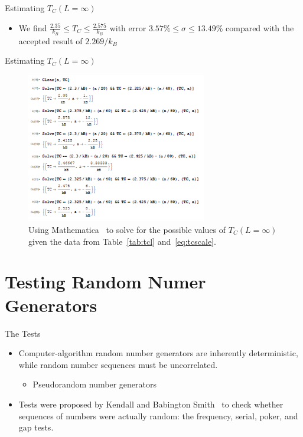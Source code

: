 \documentclass{beamer} %
\begin{document}
\begin{frame}{Estimating $T_{C}\left(L=\infty\right)$}
\begin{itemize}
\item We find $\frac{2.35}{k_{B}}\leq T_{C}\leq\frac{2.575}{k_{B}}$ with error $3.57\%\leq\sigma\leq13.49\%$ compared with the accepted result of $2.269/k_{B}$~\cite{lecture}
\end{itemize}
\end{frame}

\begin{frame}{Estimating $T_{C}\left(L=\infty\right)$}
\begin{figure}[h]
\begin{center}
\includegraphics[width=0.7\textwidth]{../Report/solveTC1}
\vspace{-0.4cm}
\caption{Using Mathematica~\cite{mathematica} to solve for the possible values of $T_{C}(L=\infty)$ given the data from Table~\ref{tab:tcl} and~\eqref{eq:tcscale}.}
\label{fig:tcsolve}
\end{center}
\end{figure}
\end{frame}

\section{Testing Random Numer Generators}

\begin{frame}{The Tests}
\begin{itemize}
\item Computer-algorithm random number generators are inherently deterministic, while random number sequences must be uncorrelated.
\begin{itemize}
\item Pseudorandom number generators
\end{itemize}
\item Tests were proposed by Kendall and Babington Smith~\cite{babington} to check whether sequences of numbers were actually random: the frequency, serial, poker, and gap tests.  
\end{itemize}
\end{frame}
\end{document}
